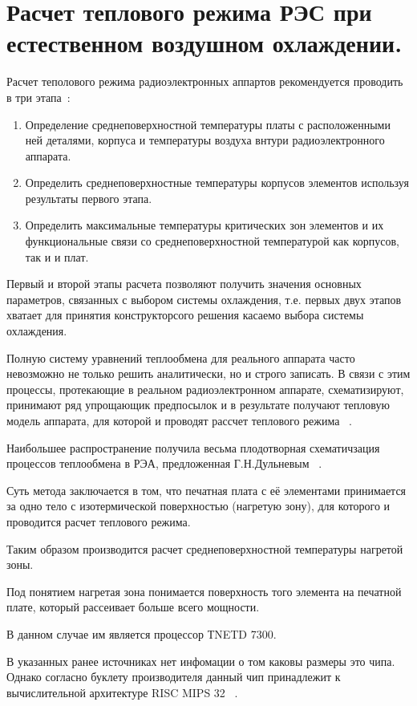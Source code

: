 \section{Расчет теплового режима РЭС при естественном воздушном охлаждении.}

Расчет теполового режима радиоэлектронных аппартов рекомендуется
проводить в три этапа~\cite{Rotkop1976}:
\begin{enumerate}[label={\arabic*.}]
  \item Определение среднеповерхностной температуры платы с
расположенными ней деталями, корпуса и температуры воздуха внтури
радиоэлектронного аппарата.
  \item Определить среднеповерхностные температуры корпусов элементов
  используя результаты первого этапа.
  \item Определить максимальные температуры критических зон элементов и
их функциональные связи со среднеповерхностной температурой как
корпусов, так и и плат.
\end{enumerate}

Первый и второй этапы расчета позволяют получить значения основных
параметров, связанных с выбором системы охлаждения, т.е. первых двух
этапов хватает для принятия конструкторсого решения касаемо выбора
системы охлаждения.

Полную систему уравнений теплообмена для реального аппарата часто
невозможно не только решить аналитически, но и строго записать. В
связи с этим процессы, протекающие в реальном радиоэлектронном
аппарате, схематизируют, принимают ряд упрощающик предпосылок и в
результате получают тепловую модель аппарата, для которой и проводят
рассчет теплового режима ~\cite{Rotkop1976}.

Наибольшее распространение получила весьма плодотворная схематичзация
процессов теплообмена в РЭА, предложенная Г.Н.Дульневым
~\cite{Dulnev1968}.

Суть метода заключается в том, что печатная плата с её элементами
принимается за одно тело с изотермической поверхностью (нагретую
зону), для которого и проводится расчет теплового режима.

Таким образом производится расчет среднеповерхностной температуры
нагретой зоны.

Под понятием нагретая зона понимается поверхность того элемента на
печатной плате, который рассеивает больше всего мощности.

В данном случае им является процессор ТNETD 7300.

В указанных ранее источниках нет инфомации о том каковы размеры это
чипа. Однако согласно буклету производителя данный чип принадлежит к
вычислительной архитектуре RISC MIPS 32 ~\cite{AR7_fact_sheet}.

